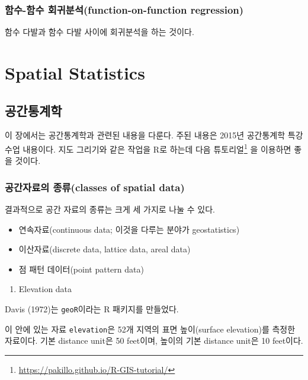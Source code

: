 \documentclass[b5paper,]{scrbook}
\providecommand{\tightlist}{%
  \setlength{\itemsep}{0pt}\setlength{\parskip}{0pt}}
\theoremstyle{plain}
\theoremstyle{definition}
\numberwithin{equation}{section}
\renewcommand{\href}[2]{#2\footnote{\url{#1}}}
\begin{document}
\hypertarget{--function-on-function-regression}{%
\section{함수-함수 회귀분석(function-on-function regression)}\label{--function-on-function-regression}}

함수 다발과 함수 다발 사이에 회귀분석을 하는 것이다.

\hypertarget{part-spatial-statistics}{%
\part{Spatial Statistics}\label{part-spatial-statistics}}

\hypertarget{spatial}{%
\chapter{공간통계학}\label{spatial}}

이 장에서는 공간통계학과 관련된 내용을 다룬다. 주된 내용은 2015년 공간통계학 특강 수업 내용이다. 지도 그리기와 같은 작업을 R로 하는데 \href{https://pakillo.github.io/R-GIS-tutorial/}{다음 튜토리얼} 을 이용하면 좋을 것이다.

\hypertarget{-classes-of-spatial-data}{%
\section{공간자료의 종류(classes of spatial data)}\label{-classes-of-spatial-data}}

결과적으로 공간 자료의 종류는 크게 세 가지로 나눌 수 있다.

\begin{itemize}
\item
  연속자료(continuous data; 이것을 다루는 분야가 geostatistics)
\item
  이산자료(discrete data, lattice data, areal data)
\item
  점 패턴 데이터(point pattern data)
\end{itemize}

\begin{enumerate}
\def\labelenumi{\arabic{enumi}.}
\tightlist
\item
  Elevation data
\end{enumerate}

Davis (1972)는 \texttt{geoR}이라는 R 패키지를 만들었다.

이 안에 있는 자료 \texttt{elevation}은 52개 지역의 표면 높이(surface elevation)를 측정한 자료이다. 기본 distance unit은 50 feet이며, 높이의 기본 distance unit은 10 feet이다.
\end{document}
